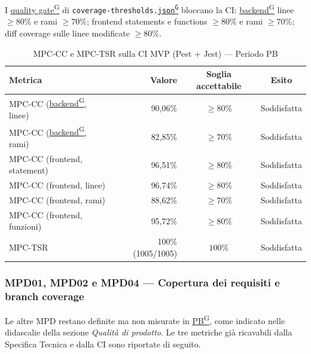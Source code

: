 \documentclass[a4paper,12pt]{article}
\providecommand{\glslink}[2]{\href{https://alittlebyte-19.github.io/Documentazione/glossario.html\#gls-#1}{\underline{#2}\textsuperscript{\scriptsize G}}}
\begin{document}
I \glslink{quality-gate}{quality gate} di \texttt{coverage-thresholds.\glslink{json}{json}} bloccano la CI: \glslink{backend}{backend} linee $\geq 80\%$ e rami $\geq 70\%$; frontend statements e functions $\geq 80\%$ e rami $\geq 70\%$; diff coverage sulle linee modificate $\geq 80\%$.

\begin{table}[H]
\centering
{}
\begin{tabular}{|l|r|c|c|}
    \hline
    \rowcolor{gray!35}
    \textbf{Metrica} & \textbf{Valore} & \textbf{Soglia accettabile} & \textbf{Esito} \\
    \hline
    MPC-CC (\glslink{backend}{backend}, linee)  & 90,06\% & $\geq 80\%$ & \textcolor{green!60!black}{Soddisfatta} \\
    MPC-CC (\glslink{backend}{backend}, rami)   & 82,85\% & $\geq 70\%$ & \textcolor{green!60!black}{Soddisfatta} \\
    MPC-CC (frontend, statement) & 96,51\% & $\geq 80\%$ & \textcolor{green!60!black}{Soddisfatta} \\
    MPC-CC (frontend, linee) & 96,74\% & $\geq 80\%$ & \textcolor{green!60!black}{Soddisfatta} \\
    MPC-CC (frontend, rami)  & 88,62\% & $\geq 70\%$ & \textcolor{green!60!black}{Soddisfatta} \\
    MPC-CC (frontend, funzioni) & 95,72\% & $\geq 80\%$ & \textcolor{green!60!black}{Soddisfatta} \\
    MPC-TSR & 100\% (1005/1005) & $100\%$ & \textcolor{green!60!black}{Soddisfatta} \\
    \hline
\end{tabular}
\caption{MPC-CC e MPC-TSR sulla CI MVP (Pest + Jest) --- Periodo PB}
\end{table}

\subsubsection{MPD01, MPD02 e MPD04 --- Copertura dei requisiti e branch coverage}

Le altre MPD restano definite ma non misurate in \glslink{pb-product-baseline}{PB}, come indicato nelle didascalie della sezione \emph{Qualità di prodotto}. Le tre metriche già ricavabili dalla Specifica Tecnica e dalla CI sono riportate di seguito.
\end{document}
